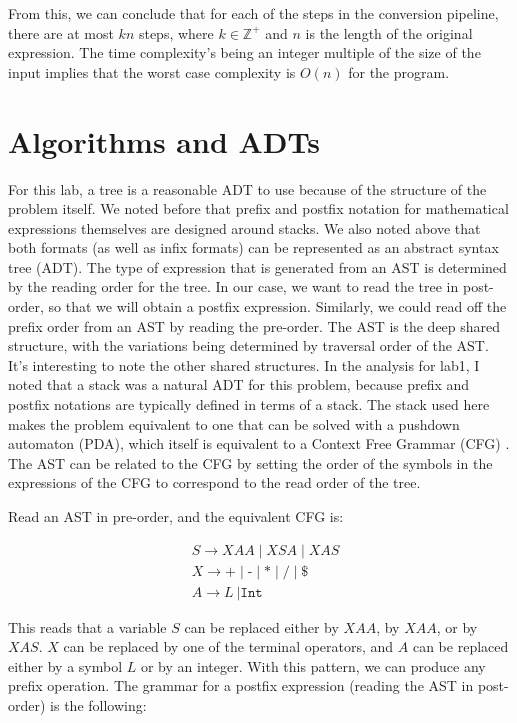 \documentclass[10pt,letterpaper,final]{report}
\begin{document}
From this, we can conclude that for each of the steps in the conversion pipeline, there are at most $kn$ steps, where $k \in \mathbb{Z^+}$ and $n$ is the length of the original expression. The time complexity's being an integer multiple of the size of the input implies that the worst case complexity is $O(n)$ for the program.

\section{Algorithms and ADTs}

For this lab, a tree is a reasonable ADT to use because of the structure of the problem itself. We noted before that prefix and postfix notation for mathematical expressions themselves are designed around stacks. We also noted above that both formats (as well as infix formats) can be represented as an abstract syntax tree (ADT). The type of expression that is generated from an AST is determined by the reading order for the tree. In our case, we want to read the tree in post-order, so that we will obtain a postfix expression. Similarly, we could read off the prefix order from an AST by reading the pre-order. The AST is the deep shared structure, with the variations being determined by traversal order of the AST. It's interesting to note the other shared structures. In the analysis for lab1, I noted that a stack was a natural ADT for this problem, because prefix and postfix notations are typically defined in terms of a stack. The stack used here makes the problem equivalent to one that can be solved with a pushdown automaton (PDA), which itself is equivalent to a Context Free Grammar (CFG) \cite{sipser2013}. The AST can be related to the CFG by setting the order of the symbols in the expressions of the CFG to correspond to the read order of the tree.

\noindent Read an AST in pre-order, and the equivalent CFG is:

\begin{align*}
   & S \to XAA \mid XSA \mid XAS                                                       \\
   & X \to \texttt{+} \mid \texttt{-} \mid \texttt{*} \mid \texttt{/} \mid \texttt{\$} \\
   & A \to L\ | \texttt{Int}
\end{align*}

This reads that a variable $S$ can be replaced either by $XAA$, by $XAA$, or by $XAS$. $X$ can be replaced by one of the terminal operators, and $A$ can be replaced either by a symbol $L$ or by an integer. With this pattern, we can produce any prefix operation. The grammar for a postfix expression (reading the AST in post-order) is the following:
\end{document}
